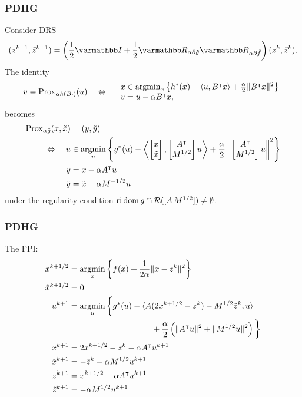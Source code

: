 \documentclass[10pt,mathserif]{beamer}
\begin{document}
 \begin{frame}[plain]
 \frametitle{PDHG}
Consider DRS
\[
(z^{k+1},\tilde{z}^{k+1})=\left(\frac{1}{2}\opI+\frac{1}{2}\opR_{\alpha \partial \tilde{g}}\opR_{\alpha \partial \tilde{f}}\right)
(z^{k},\tilde{z}^{k}).
\]
The identity
\begin{align*}
\label{eq:J_conj}
v=\mathrm{Prox}_{\alpha h(B \cdot)}(u)
\quad\Leftrightarrow\quad
\begin{array}{l}
x\in\operatorname*{argmin}_x\left\{
h^*(x)-\langle u,B^\intercal x\rangle +\frac{\alpha}{2}\|B^\intercal x\|^2
\right\}\\
v= u-\alpha B^\intercal x,
\end{array}
\end{align*}
becomes 
\begin{align*}
\mathrm{Prox}_{\alpha \tilde{g}}(x,\tilde{x})&=(y,\tilde{y})\\
\quad\Leftrightarrow\quad
 u &\in \operatorname*{argmin}_{ u }\left\{g^*( u )-\left<
\begin{bmatrix}
x\\\tilde{x}
\end{bmatrix}
,
\begin{bmatrix}
A^\intercal\\M^{1/2}
\end{bmatrix}
 u \right>
+
\frac{\alpha}{2}\left\|\begin{bmatrix}
A^\intercal\\M^{1/2}
\end{bmatrix} u \right\|^2
\right\}\\
y&=x-\alpha A^\intercal u \\
\tilde{y}&=\tilde{x}-\alpha M^{-1/2} u 
\end{align*}
under the regularity condition $\mathrm{ri}\,\mathrm{dom}\, g\cap\mathcal{R}([A\,M^{1/2}])\ne \emptyset$.
 \end{frame}

 \begin{frame}
 \frametitle{PDHG}
The FPI:
\begin{align*}
    x^{k+1/2}&=\operatorname*{argmin}_{x}\left\{    f(x)+\frac{1}{2\alpha}\|x-z^k\|^2    \right\}\\
    \tilde{x}^{k+1/2}&= 0\\
     u ^{k+1}&=\operatorname*{argmin}_{ u }\bigg\{
    g^*( u )-\langle A(2x^{k+1/2}-z^k)-M^{1/2}\tilde{z}^k, u \rangle\\
    &\qquad\qquad\qquad\qquad\qquad+\frac{\alpha}{2}\left(\|A^\intercal u \|^2+\|M^{1/2} u \|^2\right)
    \bigg\}
    \\
    x^{k+1}&=2x^{k+1/2}-z^k-\alpha A^\intercal u ^{k+1}\\
    \tilde{x}^{k+1}&=-\tilde{z}^k-\alpha M^{1/2} u ^{k+1}\\
    z^{k+1}&=x^{k+1/2}-\alpha A^\intercal u ^{k+1}\\
    \tilde{z}^{k+1}&=-\alpha M^{1/2} u ^{k+1}
\end{align*}
 \end{frame}
\end{document}
